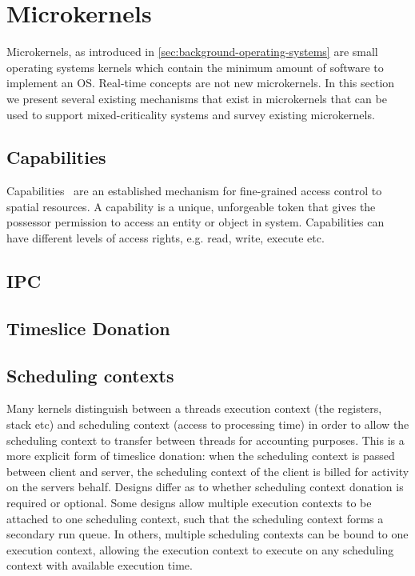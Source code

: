 
\section{Microkernels}

Microkernels, as introduced in \cref{sec:background-operating-systems} are small operating systems
kernels which contain the minimum amount of software to implement an OS. Real-time concepts are not
new microkernels. In this section we present several existing mechanisms that exist in microkernels
that can be used to support mixed-criticality systems and survey existing microkernels. 

\subsection{Capabilities}
\label{s:capabilities}

Capabilities~\citep{Dennis_VanHorn_66} are an established mechanism for fine-grained access control
to spatial resources. A capability is a unique, unforgeable token that gives the possessor
permission to access an entity or object in system. Capabilities can have different levels of access
rights, e.g. read, write, execute etc.

\subsection{IPC}


\subsection{Timeslice Donation}




\subsection{Scheduling contexts}

Many kernels distinguish between a threads execution context (the registers, stack etc) and scheduling context (access to processing time) in order to allow the scheduling context to transfer between threads for accounting purposes.
This is a more explicit form of timeslice donation: when the scheduling context is passed between client and server, the scheduling context of the client is billed for activity on the servers behalf. 
Designs differ as to whether scheduling context donation is required or optional. 
Some designs allow multiple execution contexts to be attached to one scheduling context, such that the scheduling context forms a secondary run queue. 
In others, multiple scheduling contexts can be bound to one execution context, allowing the execution context to execute on any scheduling context with available execution time. 

